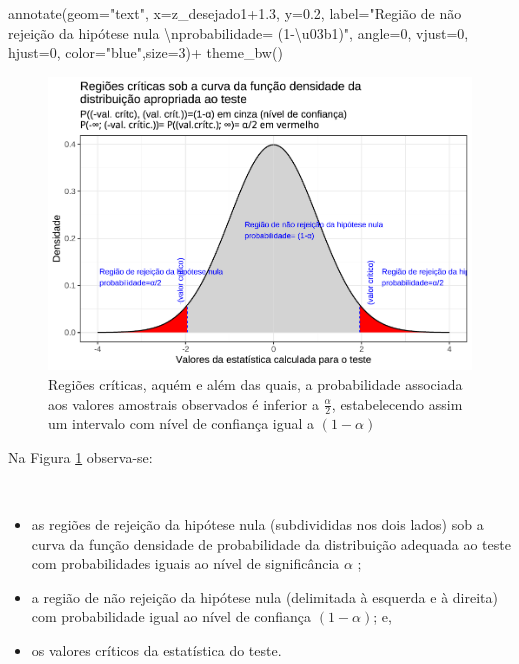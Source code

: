 \documentclass[
]{book}
\newenvironment{Shaded}{\begin{snugshade}}{\end{snugshade}}
\newcommand{\AttributeTok}[1]{\textcolor[rgb]{0.77,0.63,0.00}{#1}}
\newcommand{\DecValTok}[1]{\textcolor[rgb]{0.00,0.00,0.81}{#1}}
\newcommand{\FloatTok}[1]{\textcolor[rgb]{0.00,0.00,0.81}{#1}}
\newcommand{\FunctionTok}[1]{\textcolor[rgb]{0.00,0.00,0.00}{#1}}
\newcommand{\NormalTok}[1]{#1}
\newcommand{\SpecialCharTok}[1]{\textcolor[rgb]{0.00,0.00,0.00}{#1}}
\newcommand{\StringTok}[1]{\textcolor[rgb]{0.31,0.60,0.02}{#1}}
\providecommand{\tightlist}{%
  \setlength{\itemsep}{0pt}\setlength{\parskip}{0pt}}
\begin{document}
\begin{Shaded}
\begin{Highlighting}[]
  \FunctionTok{annotate}\NormalTok{(}\AttributeTok{geom=}\StringTok{"text"}\NormalTok{, }\AttributeTok{x=}\NormalTok{z\_desejado1}\FloatTok{+1.3}\NormalTok{, }\AttributeTok{y=}\FloatTok{0.2}\NormalTok{, }\AttributeTok{label=}\StringTok{"Região de não rejeição da hipótese nula }\SpecialCharTok{\textbackslash{}n}\StringTok{probabilidade= (1{-}\textbackslash{}u03b1)"}\NormalTok{, }\AttributeTok{angle=}\DecValTok{0}\NormalTok{, }\AttributeTok{vjust=}\DecValTok{0}\NormalTok{, }\AttributeTok{hjust=}\DecValTok{0}\NormalTok{, }\AttributeTok{color=}\StringTok{"blue"}\NormalTok{,}\AttributeTok{size=}\DecValTok{3}\NormalTok{)}\SpecialCharTok{+}
  \FunctionTok{theme\_bw}\NormalTok{()}
\end{Highlighting}
\end{Shaded}

\begin{figure}

{\centering \includegraphics[width=1\linewidth]{apostila_files/figure-latex/fig70-1} 

}

\caption{Regiões críticas, aquém e além das quais, a probabilidade associada aos valores amostrais observados é inferior a $\frac{\alpha}{2}$, estabelecendo assim um intervalo com nível de confiança igual a $(1-\alpha)$}\label{fig:fig70}
\end{figure}

\hfill\break

Na Figura \ref{fig:fig70} observa-se:

~

\begin{itemize}
\tightlist
\item
  as regiões de rejeição da hipótese nula (subdivididas nos dois lados) sob a curva da função densidade de probabilidade da distribuição adequada ao teste com probabilidades iguais ao nível de significância \(\alpha\) ;\\
\item
  a região de não rejeição da hipótese nula (delimitada à esquerda e à direita) com probabilidade igual ao nível de confiança \((1-\alpha)\); e,\\
\item
  os valores críticos da estatística do teste.
\end{itemize}
\end{document}
